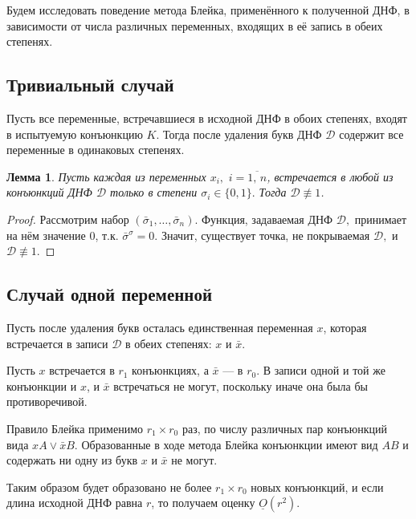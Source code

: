 \documentclass[12pt,a4paper,oneside,fleqn,leqno]{article}
\newtheorem{lemma}{Лемма}
\theoremstyle{definition}
\begin{document}
		Будем исследовать поведение метода Блейка, применённого к полученной ДНФ, в зависимости от числа различных переменных, входящих в её запись в обеих степенях.\par
		\subsection{Тривиальный случай}
			Пусть все переменные, встречавшиеся в исходной ДНФ в обоих степенях, входят в испытуемую конъюнкцию $K.$ Тогда после удаления букв ДНФ $\mathcal{D}$ содержит все переменные в одинаковых степенях.\par
			\begin{lemma}
				Пусть каждая из переменных $x_i,\,\,i = \overline{1,\,n}$, встречается в любой из конъюнкций ДНФ $\mathcal{D}$ только в степени $\sigma_i \in \{ 0, 1\}.$ Тогда $\mathcal{D} \not\equiv 1$.
			\end{lemma}
			\begin{proof}
				Рассмотрим набор $(\bar{\sigma}_1, \ldots, \bar{\sigma}_n).$ Функция, задаваемая ДНФ $\mathcal{D},$ принимает на нём значение 0, т.к. $\bar{\sigma}^{\sigma} = 0.$ Значит, существует точка, не покрываемая $\mathcal{D},$ и $\mathcal{D} \not\equiv 1$.
			\end{proof}
		\subsection{Случай одной переменной}
			Пусть после удаления букв осталась единственная переменная $x$, которая встречается в записи $\mathcal{D}$ в обеих степенях: $x$ и $\bar{x}$.\par
			Пусть $x$ встречается в $r_1$ конъюнкциях, а $\bar{x}$ --- в $r_0.$ В записи одной и той же конъюнкции и $x$, и $\bar{x}$ встречаться не могут, поскольку иначе она была бы противоречивой.\par
			Правило Блейка применимо $r_1\times r_0$ раз, по числу различных пар конъюнкций вида $xA \vee \bar{x}B.$ Образованные в ходе метода Блейка конъюнкции имеют вид $AB$ и содержать ни одну из букв $x$ и $\bar{x}$ не могут.\par
			Таким образом будет образовано не более $r_1\times r_0$ новых конъюнкций, и если длина исходной ДНФ равна $r$, то получаем оценку $\underline{O}(r^2).$
\end{document}
